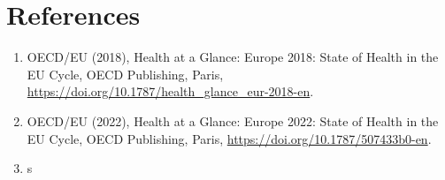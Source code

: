 \chapter{References}

\begin{enumerate}
    \item OECD/EU (2018), Health at a Glance: Europe 2018: State of Health in the EU Cycle, OECD Publishing, Paris,    \url{https://doi.org/10.1787/health_glance_eur-2018-en}.
    \item OECD/EU (2022), Health at a Glance: Europe 2022: State of Health in the EU Cycle, OECD Publishing, Paris, \url{https://doi.org/10.1787/507433b0-en}.
    \item s
\end{enumerate}